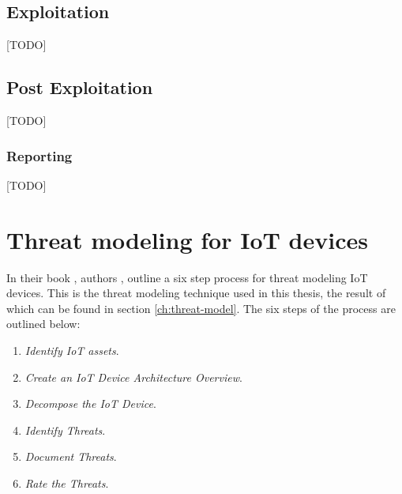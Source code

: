 \subsection{Exploitation}
[TODO]

\subsection{Post Exploitation}
[TODO]

\subsubsection{Reporting}
[TODO]

\section{Threat modeling for IoT devices} \label{ch:method:threat-modeling}
In their book , authors \citeauthor{guzman2017iot}, outline a six step process for threat modeling IoT devices. This is the threat modeling technique used in this thesis, the result of which can be found in section \ref{ch:threat-model}. The six steps of the process are outlined below:
\begin{enumerate}
    \item \textit{Identify IoT assets}.
    \item \textit{Create an IoT Device Architecture Overview}.
    \item \textit{Decompose the IoT Device}.
    \item \textit{Identify Threats}.
    \item \textit{Document Threats}.
    \item \textit{Rate the Threats}.
\end{enumerate}

